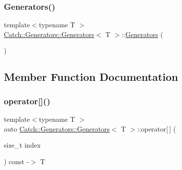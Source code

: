 \subsubsection{\texorpdfstring{Generators()}{Generators()}}
{\footnotesize\ttfamily template$<$typename T $>$ \\
\mbox{\hyperlink{struct_catch_1_1_generators_1_1_generators}{Catch\+::\+Generators\+::\+Generators}}$<$ T $>$\+::\mbox{\hyperlink{struct_catch_1_1_generators_1_1_generators}{Generators}} (\begin{DoxyParamCaption}{ }\end{DoxyParamCaption})\hspace{0.3cm}{\ttfamily [inline]}}



\subsection{Member Function Documentation}
\mbox{\label{struct_catch_1_1_generators_1_1_generators_a1812ebb7d0146d63e3a005e93831afa2}} 
\subsubsection{\texorpdfstring{operator[]()}{operator[]()}}
{\footnotesize\ttfamily template$<$typename T $>$ \\
auto \mbox{\hyperlink{struct_catch_1_1_generators_1_1_generators}{Catch\+::\+Generators\+::\+Generators}}$<$ T $>$\+::operator\mbox{[}$\,$\mbox{]} (\begin{DoxyParamCaption}\item[{size\+\_\+t}]{index }\end{DoxyParamCaption}) const -\/$>$ T \hspace{0.3cm}{\ttfamily [inline]}}

\mbox{\label{struct_catch_1_1_generators_1_1_generators_ad708036fa5a9bf0cd1520ce111bc851d}} 
